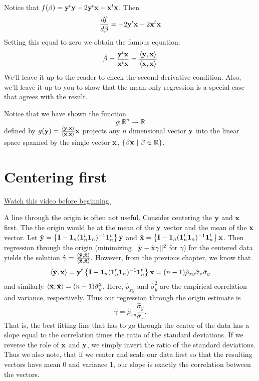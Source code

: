 Notice that
$
f(\beta) = \mathbf{y}^t \mathbf{y} - 2 \mathbf{y}^t \mathbf{x} + \mathbf{x}^t \mathbf{x}.
$
Then 
$$
\frac{df}{d\beta} = -2\mathbf{y}'\mathbf{x}  + 2 \mathbf{x}^t \mathbf{x} 
$$
Setting this equal to zero we obtain the famous equation:
$$
\hat \beta = \frac{\mathbf{y}^t \mathbf{x}}{\mathbf{x}^t \mathbf{x}}
=\frac{\langle \mathbf{y}, \mathbf{x} \rangle}{\langle \mathbf{x}, \mathbf{x} \rangle}
$$
We'll leave it up to the reader to check the second derivative 
condition. Also, we'll leave it up to you to show that the mean 
only regression is a  special case that agrees with the result.

Notice that we have shown the function
$$
g : \mathbb{R}^n \rightarrow \mathbb{R}
$$
defined by $g(\mathbf{y}) = \frac{\langle \mathbf{y}, \mathbf{x} \rangle}{\langle \mathbf{x}, \mathbf{x} \rangle}\mathbf{x}$ projects
any $n$ dimensional vector $\mathbf{y}$ into the linear space spanned
by the single vector $\mathbf{x}$, $\{\beta \mathbf{x} ~|~ \beta \in \mathbb{R}\}$.

\section{Centering first}

\href{https://www.youtube.com/watch?v=1ss_FYtiSHo&list=PLpl-gQkQivXhdgUCdaUQcdb31CRe8Mm2y&index=8}{Watch this video before beginning.}

A line through the origin is often not useful. Consider centering the
$\mathbf{y}$ and $\mathbf{x}$ first. The the origin would be at the mean of the
$\mathbf{y}$ vector and the mean of the $\mathbf{x}$ vector. Let
$\tilde {\mathbf{y}} = \left\{ \mathbf{I} - \mathbf{1}_n (\mathbf{1}_n^t \mathbf{1}_n)^{-1} \mathbf{1}_n^t \right\} \mathbf{y}$ and $\tilde {\mathbf{x}} = \left\{ \mathbf{I} - \mathbf{1}_n (\mathbf{1}_n^t \mathbf{1}_n)^{-1} \mathbf{1}_n^t \right\} \mathbf{x}$. Then regression through the origin (minimizing
$||\tilde {\mathbf{y}} - \tilde {\mathbf{x}} \gamma ||^2$ for $\gamma$)
for the centered data yields
the solution 
$
\hat \gamma = \frac{\langle \tilde {\mathbf{y}}, \tilde {\mathbf{x}} \rangle}{\langle \tilde {\mathbf{x}}, \tilde {\mathbf{x}} \rangle}.
$
However, from the previous chapter, we know that
$$
\langle \tilde {\mathbf{y}}, \tilde {\mathbf{x}} \rangle = \mathbf{y}^t \left\{ \mathbf{I} - \mathbf{1}_n (\mathbf{1}_n^t \mathbf{1}_n)^{-1} \mathbf{1}_n^t \right\} \mathbf{x}
= (n-1)\hat{\rho}_{xy} \hat{\sigma}_x \hat{\sigma}_y
$$
and similarly $\langle \tilde {\mathbf{x}}, \tilde {\mathbf{x}} \rangle = (n-1)\hat{\sigma}_y^2$.
Here, $\hat \rho_{xy}$ and $\hat{\sigma}_y^2$ are the empirical correlation and
variance, respectively. Thus our regression through the origin estimate is
$$
\hat \gamma = \hat{\rho}_{xy} \frac{\hat{\sigma}_y}{\hat{\sigma}_x}.
$$
That is, the best fitting line that has to go through the center of the data
has a slope equal to the correlation times the ratio of the standard deviations.
If we reverse the role of $\mathbf{x}$ and $\mathbf{y}$, we simply invert the ratio of the
standard deviations. Thus we also note, that if we center and scale our
data first so that the resulting vectors have mean 0 and variance 1, our
slope is exactly the correlation between the vectors.


